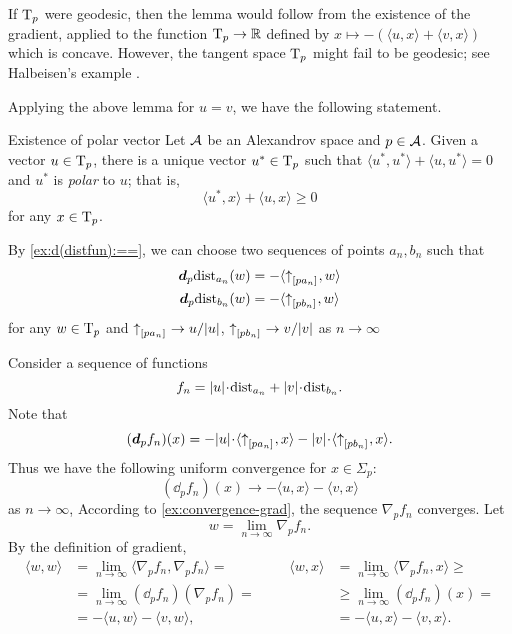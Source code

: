 If $\mathrm{T}_p$ were geodesic, then the lemma would follow from the existence  of the gradient, applied to the function $\mathrm{T}_p\to \mathbb{R}$ defined by $x\mapsto -(\langle u,x\rangle +\langle v,x\rangle )$ which is concave.
However, the tangent space $\mathrm{T}_p$ might fail to be geodesic; see  Halbeisen's example \cite{alexander-kapovitch-petrunin2024}.

Applying the above lemma for $u=v$, we have the following statement.

\begin{thm}{Existence of polar vector}\label{cor:polar}
Let $\mathcal{A}$ be an Alexandrov space 
and $p\in \mathcal{A}$. 
Given a vector $u\in \mathrm{T}_p$,  there is a unique vector $u^*\in\mathrm{T}_p$ such that $\langle u^*,u^*\rangle +\langle u,u^*\rangle = 0$ and
$u^*$ is \emph{polar} to $u$;
that is,
\[\langle u^*,x\rangle +\langle u,x\rangle \ge 0\]
for any $x\in \mathrm{T}_p$.
\end{thm}

By \ref{ex:d(distfun):==}, we can choose two sequences of points $a_n,b_n$ such that 
\begin{align*}
\bm{d}_p\mathrm{dist}_{a_n}(w)&=-\langle{\uparrow}_{[{p}{a_n}]_{{}}},w\rangle
\\
\bm{d}_p\mathrm{dist}_{b_n}(w)&=-\langle{\uparrow}_{[{p}{b_n}]_{{}}},w\rangle
\end{align*}
for any $w\in\mathrm{T}_p$ and ${\uparrow}_{[{p}{a_n}]_{{}}}\to u/|u|$, ${\uparrow}_{[{p}{b_n}]_{{}}}\to v/|v|$ as $n\to \infty$

Consider a sequence of functions 
\[f_n=|u|\cdot\distfun_{a_n}+|v|\cdot\distfun_{b_n}.\]
Note that 
\[(\dd_pf_n)(x)=-|u|\cdot\langle \dir{p}{a_n},x\rangle -|v|\cdot\langle \dir{p}{b_n},x\rangle .\]
Thus we have the following uniform convergence for $x\in\Sigma_p$:
\[(\dd_pf_n)(x)\to-\langle u,x\rangle -\langle v,x\rangle \]
as $n\to\infty$,
According to \ref{ex:convergence-grad}, 
the sequence $\nabla_pf_n$ converges.
Let 
\[w=\lim_{n\to\infty}\nabla_pf_n.\]
By the definition of gradient,
\[\begin{aligned}
\langle w,w\rangle &=\lim_{n\to\infty}\langle \nabla_pf_n,\nabla_pf_n\rangle =
&&&%
\langle w,x\rangle &=\lim_{n\to\infty}\langle \nabla_pf_n,x\rangle \ge
\\%
&=\lim_{n\to\infty}(\dd_p f_n)(\nabla_p f_n)
=
&&&%
&\ge
\lim_{n\to\infty}(\dd_pf_n)(x)
=
\\%
&=-\langle u,w\rangle -\langle v,w\rangle ,
&&&%
&=-\langle u,x\rangle -\langle v,x\rangle .
\end{aligned}\]
\qedsf

